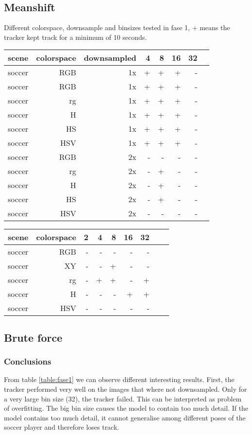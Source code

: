 \documentclass[a4paper,11pt]{article}
\begin{document}
	\subsection{Meanshift} 

	Different colorspace, downsample and binsizes tested in fase 1, +
	means the tracker kept track for a minimum of 10 seconds. 
	\begin{tabular}{l*{7}{r|}}
		\label{table:fase1}
		scene	& 	colorspace	& downsampled & 4 & 8 & 16 & 32\\
		\hline
		soccer 	& 	RGB	 		& 1x		  			  & + & + & +  &  -\\
		soccer 	& 	RGB	 		& 1x		  			  & + & + & +  &  -\\
		soccer 	& 	rg	 		& 1x 		  			  & + & + & +  &  -\\
		soccer 	& 	H	 		& 1x		 			  & + & + & +  &  -\\
		soccer 	& 	HS	 		& 1x		  			  & + & + & +  &  -\\
		soccer 	& 	HSV	 		& 1x		  			  & + & + & +  &  -\\
		soccer 	& 	RGB	 		& 2x		  			  & - & - & -  &  -\\
		soccer 	& 	rg	 		& 2x 		  			  & - & + & -  &  -\\
		soccer 	& 	H	 		& 2x		  			  & - & + & -  &  -\\
		soccer 	& 	HS	 		& 2x		  			  & - & + & -  &  -\\
		soccer 	& 	HSV	 		& 2x		  			  & - & - & -  &  -\\

	\end{tabular}	

	\begin{tabular}{l*{8}{r|}}
		scene	& 	colorspace	&  2 & 4 & 8 & 16 & 32\\
		\hline
		soccer 	& 	RGB	 		&  - & - & - & - & -\\
		soccer 	& 	XY	 		&  - & - & + & - & -\\
		soccer 	& 	rg	 		&  - & + & + & - & +\\
		soccer 	& 	H	 		&  - & - & - & + & +\\
		soccer 	& 	HSV	 		&  - & - & - & - & -\\ 
	\end{tabular}	

	\subsection{Brute force} 
\subsubsection{Conclusions}
From table \ref{table:fase1} we can observe different interesting results.
First, the tracker performed very well on the images that where not
downsampled. Only for a very large bin size (32), the tracker failed. This can be
interpreted as problem of overfitting. The big bin size causes the model to
contain too much detail. If the model contains too much detail, it cannot
generalise among different poses of the soccer player and therefore loses track.
\end{document}
